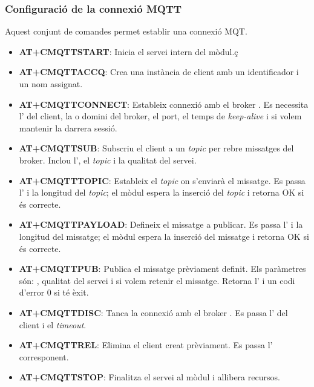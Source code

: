 \documentclass{tfgitic}[2024/07/01]
\begin{document}
\subsubsection{Configuració de la connexió MQTT} 
Aquest conjunt de comandes permet establir una connexió MQT.
\begin{itemize}
  \item \textbf{AT+CMQTTSTART}: Inicia el servei intern  del mòdul.ç
  
  \item \textbf{AT+CMQTTACCQ}: Crea una instància de client  amb un identificador i un nom assignat.
  
  \item \textbf{AT+CMQTTCONNECT}: Estableix connexió amb el broker . Es necessita l' del client, la  o domini del broker, el port, el temps de \textit{keep-alive} i si volem mantenir la darrera sessió.
  
  \item \textbf{AT+CMQTTSUB}: Subscriu el client a un \textit{topic} per rebre missatges del broker. Inclou l', el \textit{topic} i la qualitat del servei.
  
  \item \textbf{AT+CMQTTTOPIC}: Estableix el \textit{topic} on s'enviarà el missatge. Es passa l' i la longitud del \textit{topic}; el mòdul espera la inserció del \textit{topic} i retorna OK si és correcte.
  
  \item \textbf{AT+CMQTTPAYLOAD}: Defineix el missatge a publicar. Es passa l' i la longitud del missatge; el mòdul espera la inserció del missatge i retorna OK si és correcte.
  
  \item \textbf{AT+CMQTTPUB}: Publica el missatge prèviament definit. Els paràmetres són: , qualitat del servei i si volem retenir el missatge. Retorna l' i un codi d'error 0 si té èxit.
  
  \item \textbf{AT+CMQTTDISC}: Tanca la connexió amb el broker . Es passa l' del client i el \textit{timeout}.
  
  \item \textbf{AT+CMQTTREL}: Elimina el client  creat prèviament. Es passa l' corresponent.
  
  \item \textbf{AT+CMQTTSTOP}: Finalitza el servei  al mòdul i allibera recursos.
\end{itemize}
\end{document}
